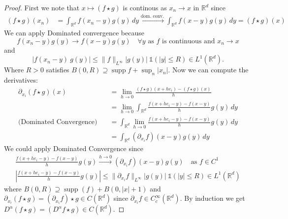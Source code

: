 \documentclass{report}
\theoremstyle{tommy}
\newcommand{\supp}{\operatorname{supp}}
\begin{document}
  \begin{proof}
    First we note that \(x \mapsto (f \star g)\) is continous as \(x_n \to x\) in \(\mathbb{R}^d\) since
    \begin{align*}
      (f \star g)(x_n) 
      &= \int_{\mathbb{R}^d} f(x_n - y) g(y) \, dy \xrightarrow{\text{dom. conv.}} \int_{\mathbb{R}^d} f(x-y) g(y) \, dy = (f \star g)(x)
    \end{align*}
    We can apply Dominated convergence because 
      \[f(x_n - y)g(y) \to f(x-y)g(y)\quad  \forall y \text{ as \(f\) is continuous and } x_n \to x\]
      and
      \[|f(x_n -y)\ g(y)| \le \|f\|_{L^\infty} |g(y)| \ \mathbb{1}(|y| \le R) \in L^1(\mathbb{R}^d).\]
      Where \(R > 0\) satisfies \(B(0, R) \supseteq \supp f + \sup_n |x_n|\).
      Now we can compute the derivatives:
      \begin{align*}
        \partial_{x_i} (f \star g)(x)
        &= \lim_{h \to 0} \frac{(f \star g)(x + he_i) - (f \star g)(x)}{h} \\
        &= \lim_{h \to 0} \int_{\mathbb{R}^d} \frac{f(x + he_i - y) - f(x-y)}{h} g(y) \, dy \\
        \text{(Dominated Convergence)} \quad &= \int_{\mathbb{R}^d}\lim_{h \to 0} \frac{f(x + he_i - y) - f(x-y)}{h} g(y) \, dy \\
        &= \int_{\mathbb{R}^d} (\partial_{x_i} f)(x-y) g(y) \, dy
      \end{align*}
      We could apply Dominated Convergence since
      \begin{align*}
        \frac{f(x + he_i -y) - f(x-y)}{h} g(y) \xrightarrow{h \to 0} (\partial_{x_i} f) (x-y) g(y) \quad \text{as \(f \in C^1\)} \\
        \left| \frac{f(x + h e_i -y) - f(x-y)}{h} g(y) \right| \le \| \partial_{x_i} f \|_{L^\infty} |g(y)| \ \mathbb{1}(|y| \le R) \in L^1(\mathbb{R}^d)
      \end{align*}
      where \(B(0, R) \supseteq \supp(f) + B(0, |x| + 1)\)
      and \(\partial_{x_i} (f \star g) = (\partial_{x_i} f) \star g \in C(\mathbb{R}^d)\) since \(\partial_{x_i} f \in C_c^\infty(\mathbb{R}^d)\).
      By induction we get \(D^\alpha (f \star g) = (D^\alpha f \star g) \in C(\mathbb{R}^d)\).
  \end{proof}
\end{document}
